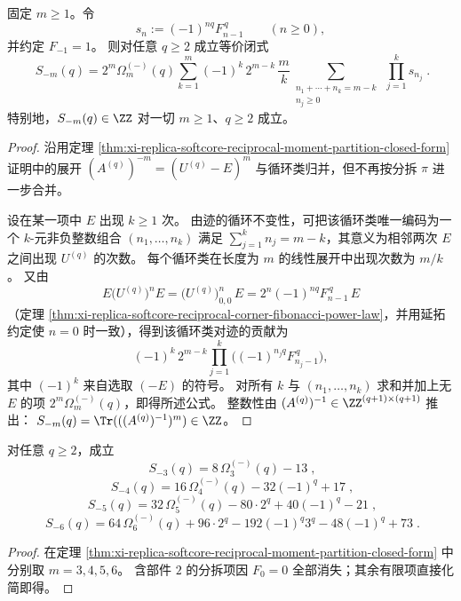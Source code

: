 \begin{theorem}[例外谱倒数幂和的环分解公式]\label{thm:xi-replica-softcore-reciprocal-moment-ring-decomposition}
固定 \(m\ge 1\)。令
\[
s_n:=(-1)^{nq}F_{n-1}^{\,q}\qquad(n\ge 0),
\]
并约定 \(F_{-1}=1\)。
则对任意 \(q\ge 2\) 成立等价闭式
\[
\boxed{\;
S_{-m}(q)
=2^m\Omega_m^{(-)}(q)
\sum_{k=1}^{m}(-1)^k\,2^{m-k}\,\frac{m}{k}
\sum_{\substack{n_1+\cdots+n_k=m-k\\ n_j\ge 0}}
\ \prod_{j=1}^{k}s_{n_j}\; }.
\]
特别地，\(S_{-m}(q)\in\ZZ\) 对一切 \(m\ge 1\)、\(q\ge 2\) 成立。
\end{theorem}
\begin{proof}
沿用定理 \ref{thm:xi-replica-softcore-reciprocal-moment-partition-closed-form} 证明中的展开
\(
(A^{(q)})^{-m}=(U^{(q)}-E)^m
\)
与循环类归并，但不再按分拆 \(\pi\) 进一步合并。

\par
设在某一项中 \(E\) 出现 \(k\ge 1\) 次。
由迹的循环不变性，可把该循环类唯一编码为一个 \(k\)-元非负整数组合 \((n_1,\dots,n_k)\) 满足 \(\sum_{j=1}^{k}n_j=m-k\)，其意义为相邻两次 \(E\) 之间出现 \(U^{(q)}\) 的次数。
每个循环类在长度为 \(m\) 的线性展开中出现次数为 \(m/k\)。
又由
\[
E\bigl(U^{(q)}\bigr)^{n}E=\bigl(U^{(q)}\bigr)^{n}_{0,0}\,E
=2^n(-1)^{nq}F_{n-1}^{\,q}\,E
\]
（定理 \ref{thm:xi-replica-softcore-reciprocal-corner-fibonacci-power-law}，并用延拓约定使 \(n=0\) 时一致），得到该循环类对迹的贡献为
\[
(-1)^k\,2^{m-k}\prod_{j=1}^{k}\bigl((-1)^{n_jq}F_{n_j-1}^{\,q}\bigr),
\]
其中 \((-1)^k\) 来自选取 \((-E)\) 的符号。
对所有 \(k\) 与 \((n_1,\dots,n_k)\) 求和并加上无 \(E\) 的项 \(2^m\Omega_m^{(-)}(q)\)，即得所述公式。
整数性由 \( (A^{(q)})^{-1}\in\ZZ^{(q+1)\times(q+1)} \) 推出：
\(
S_{-m}(q)=\Tr(((A^{(q)})^{-1})^m)\in\ZZ
\)。
\end{proof}

\begin{corollary}[倒数三至六次矩的显式闭式]\label{cor:xi-replica-softcore-reciprocal-moment-m3-m6-closed}
对任意 \(q\ge2\)，成立
\[
\boxed{\;
S_{-3}(q)=8\,\Omega_3^{(-)}(q)-13\;},
\]
\[
\boxed{\;
S_{-4}(q)=16\,\Omega_4^{(-)}(q)-32(-1)^q+17\;},
\]
\[
\boxed{\;
S_{-5}(q)=32\,\Omega_5^{(-)}(q)-80\cdot 2^q+40(-1)^q-21\;},
\]
\[
\boxed{\;
S_{-6}(q)=64\,\Omega_6^{(-)}(q)+96\cdot 2^q-192(-1)^q3^q-48(-1)^q+73\; }.
\]
\end{corollary}
\begin{proof}
在定理 \ref{thm:xi-replica-softcore-reciprocal-moment-partition-closed-form} 中分别取 \(m=3,4,5,6\)。
含部件 \(2\) 的分拆项因 \(F_0=0\) 全部消失；其余有限项直接化简即得。
\end{proof}


